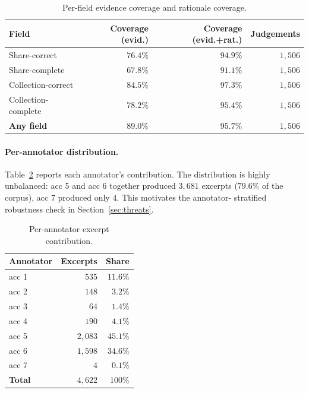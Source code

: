 \documentclass[11pt,a4paper]{article}
\newcommand{\dec}[1]{\textsf{#1}}
\begin{document}
\begin{table}[t]
\centering\small
\caption{Per-field evidence coverage and rationale coverage.}
\label{tab:coverage}
\begin{tabular}{lrrr}
\toprule
Field & Coverage (evid.) & Coverage (evid.+rat.) & Judgements \\
\midrule
Share-correct        & $76.4\%$ & $94.9\%$ & $1{,}506$ \\
Share-complete       & $67.8\%$ & $91.1\%$ & $1{,}506$ \\
Collection-correct   & $84.5\%$ & $97.3\%$ & $1{,}506$ \\
Collection-complete  & $78.2\%$ & $95.4\%$ & $1{,}506$ \\
\midrule
\textbf{Any field}   & $89.0\%$ & $\mathbf{95.7\%}$ & $1{,}506$ \\
\bottomrule
\end{tabular}
\end{table}

\paragraph{Per-annotator distribution.}\label{sec:perannot}
Table~\ref{tab:perannot} reports each annotator's contribution. The
distribution is highly unbalanced: \dec{acc 5} and \dec{acc 6}
together produced $3{,}681$ excerpts ($79.6\%$ of the corpus),
\dec{acc 7} produced only $4$. This motivates the annotator-
stratified robustness check in Section~\ref{sec:threats}.

\begin{table}[t]
\centering\small
\caption{Per-annotator excerpt contribution.}
\label{tab:perannot}
\begin{tabular}{lrr}
\toprule
Annotator & Excerpts & Share \\
\midrule
\dec{acc 1} & $\phantom{1,}535$  & $11.6\%$ \\
\dec{acc 2} & $\phantom{1,}148$  & $\phantom{1}3.2\%$ \\
\dec{acc 3} & $\phantom{1,1,}64$ & $\phantom{1}1.4\%$ \\
\dec{acc 4} & $\phantom{1,}190$  & $\phantom{1}4.1\%$ \\
\dec{acc 5} & $2{,}083$          & $45.1\%$ \\
\dec{acc 6} & $1{,}598$          & $34.6\%$ \\
\dec{acc 7} & $\phantom{1,1,1,}4$& $\phantom{1}0.1\%$ \\
\midrule
\textbf{Total} & \textbf{$4{,}622$} & \textbf{$100\%$} \\
\bottomrule
\end{tabular}
\end{table}
\end{document}
